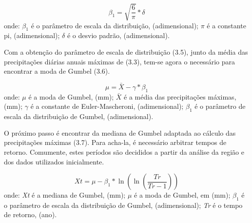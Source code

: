 \begin{equation}
\beta_{1} = \sqrt{\frac{6}{\pi}} * \delta
\end{equation}
\newline
onde:
\newline
$\beta_{1}$ é o parâmetro de escala da distribuição, (adimensional);
\newline
$\pi$ é a constante pi, (adimensional);
\newline
$\delta$ é o desvio padrão, (adimensional).\bigskip

Com a obtenção do parâmetro de escala de distribuição (3.5), junto da média das precipitações diárias anuais máximas de (3.3), tem-se agora o necessário para encontrar a moda de Gumbel (3.6).\bigskip

\begin{equation}
\mu = \bar{X} - \gamma * \beta_{1}
\end{equation}
\newline
\newline
onde:
\newline
$\mu$ é a moda de Gumbel, (mm);
\newline
$\bar{X}$ é a média das precipitações máximas, (mm);
\newline
$\gamma$ é a constante de Euler-Mascheroni, (adimensional);
\newline
$\beta_{1}$ é o parâmetro de escala da distribuição de Gumbel, (adimensional).\bigskip

O próximo passo é encontrar da mediana de Gumbel adaptada ao cálculo das precipitações máximas (3.7). Para acha-la, é necessário arbitrar tempos de retorno. Comumente, estes períodos são decididos a partir da análise da região e dos dados utilizados inicialmente.\bigskip

\begin{equation}
Xt = \mu - \beta_{1} * \ln{\left(\ln{\left(\frac{Tr}{Tr - 1}\right)}\right)}
\end{equation}
\newline
onde:
\newline
\textit{Xt} é a mediana de Gumbel, (mm);
\newline
$\mu$ é a moda de Gumbel, em (mm);
\newline
$\beta_{1}$ é o parâmetro de escala da distribuição de Gumbel, (adimensional);
\newline
\textit{Tr} é o tempo de retorno, (ano).\bigskip

